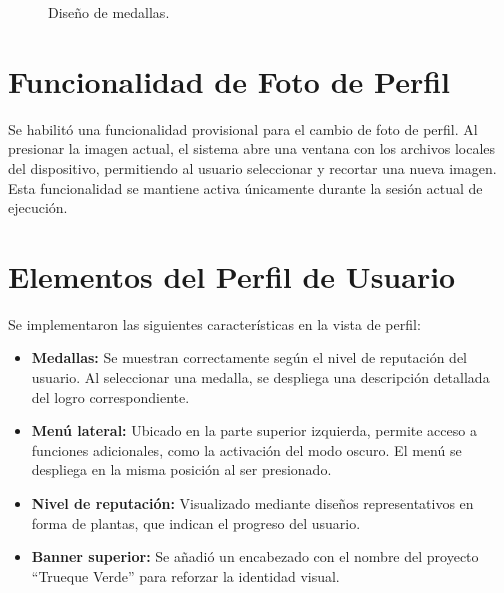 \documentclass[11pt, a4paper, oneside]{book}
\begin{document}
\begin{figure}[H]
\begin{minipage}{0.40\textwidth}
        \caption{Diseño de medallas.}
    \end{minipage}
\end{figure}

\section{Funcionalidad de Foto de Perfil}

Se habilitó una funcionalidad provisional para el cambio de foto de perfil. Al presionar la imagen actual, el sistema abre una ventana con los archivos locales del dispositivo, permitiendo al usuario seleccionar y recortar una nueva imagen. Esta funcionalidad se mantiene activa únicamente durante la sesión actual de ejecución.

\section{Elementos del Perfil de Usuario}

Se implementaron las siguientes características en la vista de perfil:

\begin{itemize}
    \item \textbf{Medallas:} Se muestran correctamente según el nivel de reputación del usuario. Al seleccionar una medalla, se despliega una descripción detallada del logro correspondiente.
    \item \textbf{Menú lateral:} Ubicado en la parte superior izquierda, permite acceso a funciones adicionales, como la activación del modo oscuro. El menú se despliega en la misma posición al ser presionado.
    \item \textbf{Nivel de reputación:} Visualizado mediante diseños representativos en forma de plantas, que indican el progreso del usuario.
    \item \textbf{Banner superior:} Se añadió un encabezado con el nombre del proyecto ``Trueque Verde'' para reforzar la identidad visual.
\end{itemize}
\end{document}
